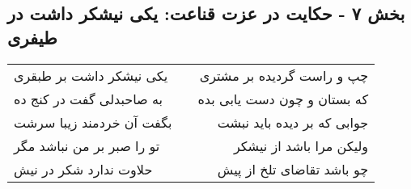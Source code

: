 \begin{center}
\section*{بخش ۷ - حکایت در عزت قناعت: یکی نیشکر داشت در طیفری}
\label{sec:007}
\begin{longtable}{l p{0.5cm} r}
یکی نیشکر داشت بر طبقری
&&
چپ و راست گردیده بر مشتری
\\
به صاحبدلی گفت در کنج ده
&&
که بستان و چون دست یابی بده
\\
بگفت آن خردمند زیبا سرشت
&&
جوابی که بر دیده باید نبشت
\\
تو را صبر بر من نباشد مگر
&&
ولیکن مرا باشد از نیشکر
\\
حلاوت ندارد شکر در نیش
&&
چو باشد تقاضای تلخ از پیش
\\
\end{longtable}
\end{center}

